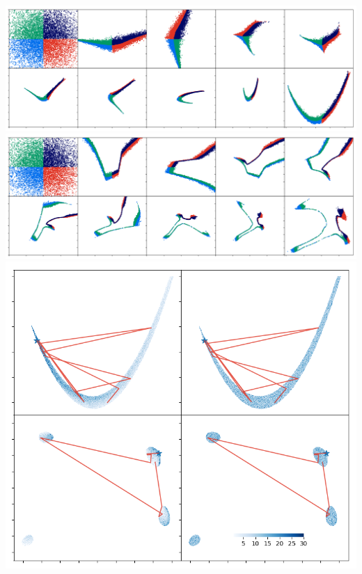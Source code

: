 \documentclass[aspectratio=169]{beamer}
\begin{document}
\begin{frame}
\begin{columns}
        \begin{columns}
            \includegraphics[width=\textwidth]{figures/rosenbrock_flow.png}
            \includegraphics[width=\textwidth]{figures/himmelblau_flow.png}
            \includegraphics[width=\textwidth]{figures/chains.png}
        \end{columns}
        \vfill
    \end{columns}
\end{frame}
\end{document}
